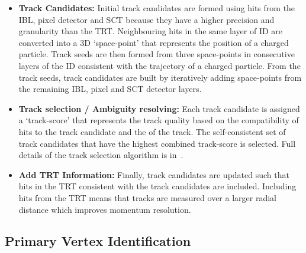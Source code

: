 \begin{itemize}[leftmargin=*]
\item\textbf{Track Candidates:}
  Initial track candidates are formed using hits from the IBL, pixel detector and SCT because they have a higher precision and granularity than the TRT.
  Neighbouring hits in the same layer of ID are converted into a 3D `space-point' that represents the position of a charged particle.
  Track seeds are then formed from three space-points in consecutive layers of the ID
  consistent with the trajectory of a charged particle. %
  From the track seeds, track candidates are built by iteratively adding space-points
  from the remaining IBL, pixel and SCT detector layers.
  \\\vspace{0.5em}
\item\textbf{Track selection / Ambiguity resolving:}
  Each track candidate is assigned a `track-score' that represents the track quality based on
  the compatibility of hits to the track candidate and the \pT{} of the track.
  The self-consistent set of track candidates that have the highest combined track-score is selected.
  Full details of the track selection algorithm is in~\cite{obj-tracks_TIDE}.\vspace{0.5em}
\item\textbf{Add TRT Information:}
  Finally, track candidates are updated such that hits in the TRT consistent with the track candidates are included.
  Including hits from the TRT means that tracks are measured over a larger radial distance which improves momentum resolution.
\end{itemize}

\subsection{Primary Vertex Identification}
\label{sec:obj-tracks_pv}

